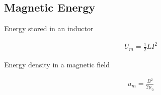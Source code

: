 \documentclass[../main.tex]{subfiles}
\begin{document}
\subsection{Magnetic Energy}
\label{sub:magnetic_energy}

\begin{description}
  \item[Energy stored in an inductor]
    \begin{align}
      U_m = \frac{1}{2}LI^2
    \end{align}
  \item[Energy density in a magnetic field]
    \begin{align}
      u_m = \frac{B^2}{2\mu_0}
    \end{align}
\end{description}
\end{document}
